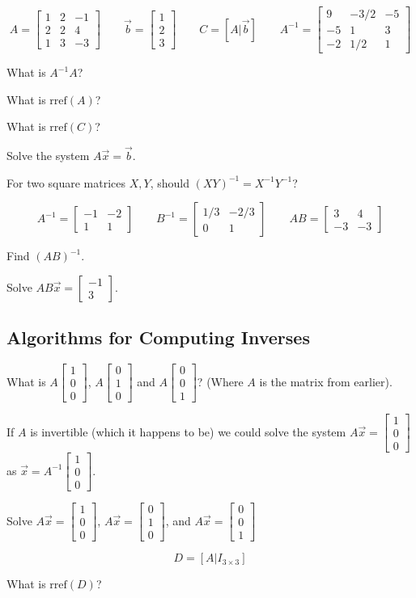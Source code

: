 \documentclass{article}
\newcommand{\rref}{\mathrm{rref}}
\newcommand{\mat}[1]{\begin{bmatrix}#1\end{bmatrix}}
\begin{document}
	\[
		A=\mat{1&2&-1\\2&2&4\\1&3&-3}\qquad
		\vec b=\mat{1\\2\\3}\qquad
		C=[A|\vec b]\qquad
		A^{-1}=\mat{9&-3/2&-5\\-5&1&3\\-2&1/2&1}
	\]
	\begin{Enum}
		\item What is $A^{-1}A$?
		\item What is $\rref(A)$?
		\item What is $\rref(C)$?
		\item Solve the system $A\vec x=\vec b$.
	\end{Enum}
	\begin{Enum}
		\item For two square matrices $X,Y$, should $(XY)^{-1}=X^{-1}Y^{-1}$?
	\end{Enum}
	\[
		A^{-1}=\mat{-1&-2\\1&1}\qquad B^{-1}=\mat{1/3&-2/3\\0&1}\qquad 
		AB=\mat{3&4\\-3&-3}
	\]
	\begin{Enum}
		\item Find $(AB)^{-1}$.
		\item Solve $AB\vec x=\mat{-1\\3}$.
	\end{Enum}
\subsection*{Algorithms for Computing Inverses}
	\begin{Enum}
		\item What is $A\mat{1\\0\\0}$, $A\mat{0\\1\\0}$
			and $A\mat{0\\0\\1}$? (Where $A$ is the matrix from earlier).
	\end{Enum}
	If $A$ is invertible (which it happens to be) we could solve 
	the system $A\vec x=\mat{1\\0\\0}$ as $\vec x=A^{-1}\mat{1\\0\\0}$.

	\begin{Enum}[resume]
		\item Solve $A\vec x=\mat{1\\0\\0}$,  $A\vec x=\mat{0\\1\\0}$, 
			and $A\vec x=\mat{0\\0\\1}$
	\end{Enum}
	\[
		D=[A|I_{3\times 3}]
	\]
	\begin{Enum}[resume]
	\item What is $\rref(D)$?
	\end{Enum}
\end{document}
